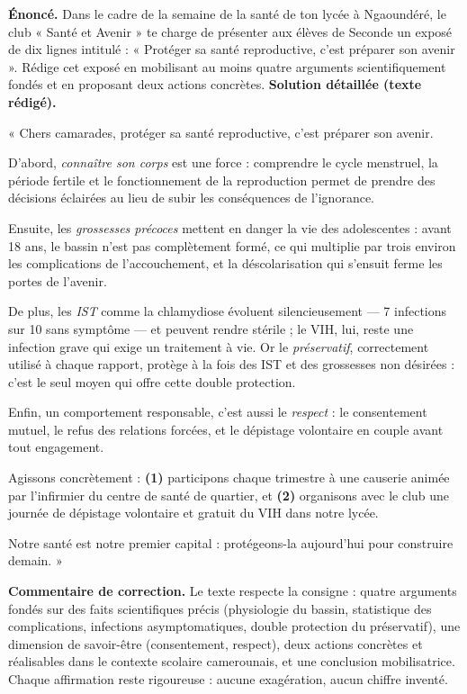 \documentclass[11pt]{article}
\begin{document}
\begin{exoresolu}
\textbf{Énoncé.} Dans le cadre de la semaine de la santé de ton lycée à Ngaoundéré, le club « Santé et Avenir » te charge de présenter aux élèves de Seconde un exposé de dix lignes intitulé : « Protéger sa santé reproductive, c'est préparer son avenir ». Rédige cet exposé en mobilisant au moins quatre arguments scientifiquement fondés et en proposant deux actions concrètes.
\tcblower
\textbf{Solution détaillée (texte rédigé).}

« Chers camarades, protéger sa santé reproductive, c'est préparer son avenir.

D'abord, \emph{connaître son corps} est une force : comprendre le cycle menstruel, la période fertile et le fonctionnement de la reproduction permet de prendre des décisions éclairées au lieu de subir les conséquences de l'ignorance.

Ensuite, les \emph{grossesses précoces} mettent en danger la vie des adolescentes : avant 18 ans, le bassin n'est pas complètement formé, ce qui multiplie par trois environ les complications de l'accouchement, et la déscolarisation qui s'ensuit ferme les portes de l'avenir.

De plus, les \emph{IST} comme la chlamydiose évoluent silencieusement — 7 infections sur 10 sans symptôme — et peuvent rendre stérile ; le VIH, lui, reste une infection grave qui exige un traitement à vie. Or le \emph{préservatif}, correctement utilisé à chaque rapport, protège à la fois des IST et des grossesses non désirées : c'est le seul moyen qui offre cette double protection.

Enfin, un comportement responsable, c'est aussi le \emph{respect} : le consentement mutuel, le refus des relations forcées, et le dépistage volontaire en couple avant tout engagement.

Agissons concrètement : \textbf{(1)} participons chaque trimestre à une causerie animée par l'infirmier du centre de santé de quartier, et \textbf{(2)} organisons avec le club une journée de dépistage volontaire et gratuit du VIH dans notre lycée.

Notre santé est notre premier capital : protégeons-la aujourd'hui pour construire demain. »

\textbf{Commentaire de correction.} Le texte respecte la consigne : quatre arguments fondés sur des faits scientifiques précis (physiologie du bassin, statistique des complications, infections asymptomatiques, double protection du préservatif), une dimension de savoir-être (consentement, respect), deux actions concrètes et réalisables dans le contexte scolaire camerounais, et une conclusion mobilisatrice. Chaque affirmation reste rigoureuse : aucune exagération, aucun chiffre inventé.
\end{exoresolu}
\end{document}
